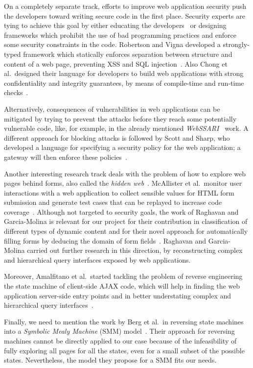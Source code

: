 On a completely separate track, efforts to improve web application security
push the developers toward writing secure code in the first place. Security
experts are tying to achieve this goal by either educating the
developers~\cite{spi02:complete} or designing frameworks which prohibit the use
of bad programming practices and enforce some security constraints in the code.
Robertson and Vigna developed a strongly-typed framework which statically
enforces separation between structure and content of a web page, preventing XSS
and SQL injection~\cite{robertson09}. Also Chong et al.\ designed their
language for developers to build web applications with strong confidentiality
and integrity guarantees, by means of compile-time and run-time checks~\cite{chong07}.

Alternatively, consequences of vulnerabilities in web applications can be
mitigated by trying to prevent the attacks before they reach some potentially
vulnerable code, like, for example, in the already mentioned
\emph{WebSSARI}~\cite{huang04:securing} work. A different approach for
blocking attacks is followed by Scott and Sharp, who developed a language for
specifying a security policy for the web application; a gateway will then
enforce these policies~\cite{scott02}.

Another interesting research track deals with the problem of how to explore web
pages behind forms, also called the \emph{hidden
  web}~\cite{raghavan01:hidden-web}. McAllister et al.\ monitor user
interactions with a web application to collect sensible values for HTML form
submission and generate test cases that can be replayed to increase code
coverage~\cite{mcallister08}. Although not targeted to security
goals, the work of Raghavan and Garcia-Molina is relevant for our project for
their contribution in classification of different types of dynamic content and
for their novel approach for automatically filling forms by deducing the domain
of form fields~\cite{raghavan01:hidden-web}. Raghavan and Garcia-Molina carried
out further research in this direction, by reconstructing complex and
hierarchical query interfaces exposed by web applications.

Moreover, Amalfitano et al.\ started tackling the problem of reverse engineering
the state machine of client-side AJAX code, which will help in finding the web
application server-side entry points and in better understating complex and
hierarchical query interfaces~\cite{amalfitano08}.

Finally, we need to mention the work by Berg et al.\ in reversing state
machines into a \emph{Symbolic Mealy Machine} (SMM)
model~\cite{berg08}. Their approach for reversing machines
cannot be directly applied to our case because of the infeasibility of fully
exploring all pages for all the states, even for a small subset of the possible
states. Nevertheless, the model they propose for a SMM fits our needs.
